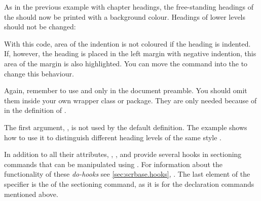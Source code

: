 \begin{Example}
  As in the previous example with chapter headings, the free-standing headings
  of the   should now be printed with a
  background colour. Headings of lower levels should not be changed:
\begin{lstcode}
  \makeatletter
  \renewcommand{\sectionlinesformat}[4]{%
    \@tempswafalse
    \Ifstr{#1}{section}{%
      \hspace*{#2}%
      \colorbox{yellow}{%
        \parbox{\dimexpr\linewidth-2\fboxrule-2\fboxsep-#2}{%
          \raggedsection
          \@hangfrom{#3}{#4}%
        }%
      }%
    }{%
      \@hangfrom{\hskip #2#3}{#4}%
    }%
  }
  \makeatother
\end{lstcode}
  With this code, area of the indention is not coloured if the heading is
  indented. If, however, the heading is placed in the left margin with
  negative indention, this area of the margin is also highlighted. You can
  move the  command into the  to change this
  behaviour.

  Again, remember to use  and  only in
  the document preamble. You should omit them inside your own wrapper class or
  package. They are only needed because of  in the definition
  of .
\end{Example}

The first argument, , is not used by the default definition. The
example shows how to use it to distinguish different heading levels of the
same style .%
\EndIndexGroup


\begin{Declaration}
%
%
%
%
%
%
\end{Declaration}
%
In addition to all their attributes,
,
,
 and
 provide several hooks in
sectioning commands that can be manipulated using
. For information about the functionality of
these \emph{do-hooks} see \autoref{sec:scrbase.hooks},
. The last element of the specifier is the
 of the sectioning command, as it is for the declaration commands
mentioned above.

